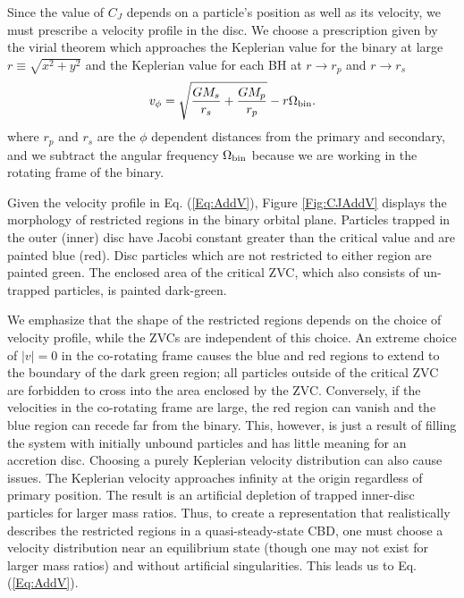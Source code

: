 \documentclass[usenatbib]{mnras}
\def\bin{\rm{bin}}
\begin{document}
Since the value of $C_J$ depends on a particle's position as well as
its velocity, we must prescribe a velocity profile in the disc. We
choose a prescription given by the virial theorem which approaches the
Keplerian value for the binary at large $r\equiv\sqrt{x^2 + y^2}$ and
the Keplerian value for each BH at $r \rightarrow r_p$ and $r
\rightarrow r_s$
\begin{equation}
v_{\phi} =   \sqrt{\frac{GM_s}{r_s} + \frac{GM_p}{r_p}}  - r\Omega_{\bin}.
\label{Eq:AddV}
\end{equation}
where $r_p$ and $r_s$ are the $\phi$ dependent distances from the
primary and secondary, and we subtract the angular frequency
$\Omega_{\bin}$ because we are working in the rotating frame of the
binary.


Given the velocity profile in Eq. (\ref{Eq:AddV}), Figure
\ref{Fig:CJAddV} displays the morphology of restricted regions in the
binary orbital plane. Particles trapped in the outer (inner) disc have
Jacobi constant greater than the critical value and are painted blue
(red). Disc particles which are not restricted to either region are
painted green. The enclosed area of the critical ZVC, which also
consists of un-trapped particles, is painted dark-green.


We emphasize that the shape of the restricted regions depends on the
choice of velocity profile, while the ZVCs are independent of this
choice. An extreme choice of $|v|=0$ in the co-rotating frame causes
the blue and red regions to extend to the boundary of the dark green
region; all particles outside of the critical ZVC are forbidden to
cross into the area enclosed by the ZVC. Conversely, if the velocities
in the co-rotating frame are large, the red region can vanish and the
blue region can recede far from the binary. This, however, is just a
result of filling the system with initially unbound particles and has
little meaning for an accretion disc. Choosing a purely Keplerian
velocity distribution can also cause issues. The Keplerian velocity
approaches infinity at the origin regardless of primary position. The
result is an artificial depletion of trapped inner-disc particles for
larger mass ratios. Thus, to create a representation that
realistically describes the restricted regions in a quasi-steady-state
CBD, one must choose a velocity distribution near an equilibrium state
(though one may not exist for larger mass ratios) and without
artificial singularities. This leads us to Eq. (\ref{Eq:AddV}).
\end{document}
